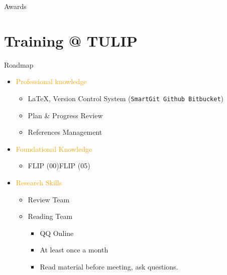 \documentclass[
 size=14pt,
 paper=smartboard,  %
 mode=present, 		%
 display=slides, 	%
 pauseslide,
 fleqn,leqno]{powerdot}{}
\newcommand{\draftnote}[3]{
	\todo[author=#2,color=#1!30,size=\footnotesize]{\textsf{#3}}	}
\newcommand{\gangli}[1]{\draftnote{blue}{GLi:}{#1}}
\begin{document}
\begin{slide}[toc=,bm=]{Awards}


\end{slide}


\section{Training @ TULIP}


\begin{slide}{Roadmap}
\begin{itemize}
  \item \textcolor{orange}{Professional knowledge}
    \begin{itemize}
          \item \LaTeX{},
                Version Control System (\texttt{SmartGit Github Bitbucket})
          \item Plan \& Progress Review
          \item References Management
        \end{itemize}
  \item \textcolor{orange}{Foundational Knowledge}
    \begin{itemize}
      \item FLIP (00)\texttildelow FLIP (05)
    \end{itemize}
  \item \textcolor{orange}{Research Skills}
    \begin{itemize}
      \item Review Team
      \item Reading Team
        \begin{itemize}
          \item QQ Online
          \item At least once a month
          \item Read material before meeting,
                ask questions.
        \end{itemize}
    \end{itemize}
\end{itemize}
\end{slide}
\end{document}
